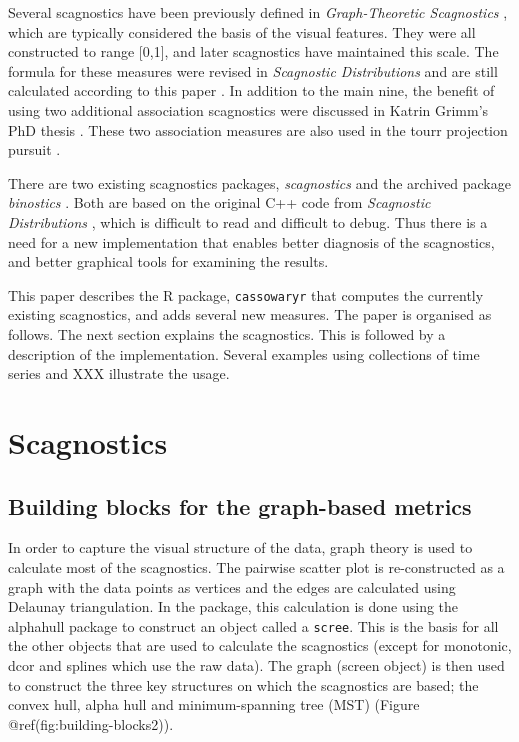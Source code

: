 Several scagnostics have been previously defined in
\emph{Graph-Theoretic Scagnostics} \citep{scag}, which are typically
considered the basis of the visual features. They were all constructed
to range {[}0,1{]}, and later scagnostics have maintained this scale.
The formula for these measures were revised in \emph{Scagnostic
Distributions} and are still calculated according to this paper
\citep{scagdist}. In addition to the main nine, the benefit of using two
additional association scagnostics were discussed in Katrin Grimm's PhD
thesis \citep{Grimm}. These two association measures are also used in
the tourr projection pursuit \citep{tourrpp}.

There are two existing scagnostics packages, \emph{scagnostics}
\citep{scagdist} and the archived package \emph{binostics}
\citep{binostics}. Both are based on the original C++ code from
\emph{Scagnostic Distributions} \citep{scagdist}, which is difficult to
read and difficult to debug. Thus there is a need for a new
implementation that enables better diagnosis of the scagnostics, and
better graphical tools for examining the results.

This paper describes the R package, \texttt{cassowaryr} that computes
the currently existing scagnostics, and adds several new measures. The
paper is organised as follows. The next section explains the
scagnostics. This is followed by a description of the implementation.
Several examples using collections of time series and XXX illustrate the
usage.

\hypertarget{scagnostics}{%
\section{Scagnostics}\label{scagnostics}}

\hypertarget{building-blocks-for-the-graph-based-metrics}{%
\subsection{Building blocks for the graph-based
metrics}\label{building-blocks-for-the-graph-based-metrics}}

In order to capture the visual structure of the data, graph theory is
used to calculate most of the scagnostics. The pairwise scatter plot is
re-constructed as a graph with the data points as vertices and the edges
are calculated using Delaunay triangulation. In the package, this
calculation is done using the alphahull package \citep{alphahull} to
construct an object called a \texttt{scree}. This is the basis for all
the other objects that are used to calculate the scagnostics (except for
monotonic, dcor and splines which use the raw data). The graph (screen
object) is then used to construct the three key structures on which the
scagnostics are based; the convex hull, alpha hull and minimum-spanning
tree (MST) (Figure @ref(fig:building-blocks2)).

